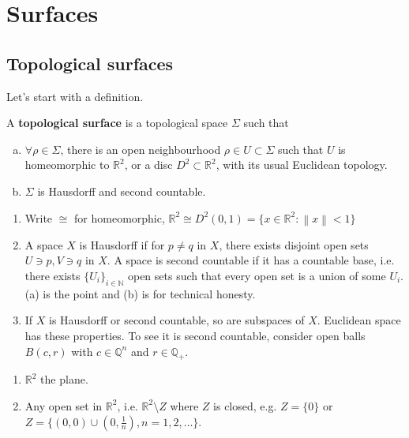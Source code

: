 \documentclass[a4paper]{article}
\begin{document}
\maketitle
\tableofcontents
\clearpage

\section{Surfaces}
\subsection{Topological surfaces}
Let's start with a definition.
\begin{definition}
    A \textbf{topological surface} is a topological space $ \Sigma $ such that 
    \begin{enumerate}[(a)]
        \item $ \forall \rho\in \Sigma $, there is an open neighbourhood $\rho\in U \subset \Sigma$ such that $U$ is homeomorphic to $\mathbb{R}^2$, or a disc $D^2 \subset \mathbb{R}^{2}$, with its usual Euclidean topology. 
        \item $\Sigma$ is Hausdorff and second countable. 
    \end{enumerate}
\end{definition}
\begin{remark}
    \begin{enumerate}[(1)]
        \item Write $ \cong $ for homeomorphic, $ \mathbb{R}^{2} \cong D^2(0,1) = \{x\in \mathbb{R}^{2}: \left\| x \right\|<1\} $

        \item A space $X$ is Hausdorff if for $p\neq q$ in $X$, there exists disjoint open sets $U\ni p, V\ni q$ in $X$. 
        A space is second countable if it has a countable base, i.e. there exists $ \{U_i\}_{i\in \mathbb{N}} $ open sets such that every open set is a union of some $U_i$. (a) is the point and (b) is for technical honesty.
             
        \item If $X$ is Hausdorff or second countable, so are subspaces of $X$. Euclidean space has these properties. To see it is second countable, consider open balls $B(c,r)$ with $c\in \mathbb{Q}^n$ and $r\in \mathbb{Q}_+$. 
    \end{enumerate}
\end{remark}

\begin{example}
    \begin{enumerate}
        \item $ \mathbb{R}^{2}$ the plane. 
        \item Any open set in $ \mathbb{R}^{2}$, i.e. $ \mathbb{R}^{2}\setminus Z $ where $Z$ is closed, e.g. $ Z = \{0\} $ or $ Z = \{(0,0) \cup (0,\frac{1}{n}), n=1,2,\dots\} $. 
    \end{enumerate}
\end{example}
\end{document}
